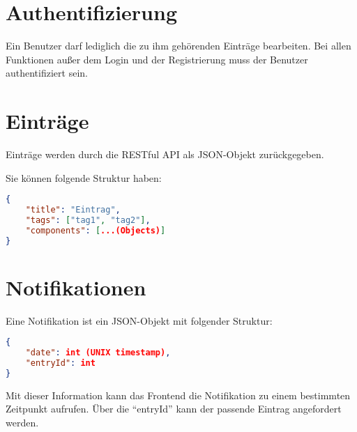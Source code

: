 \section{Authentifizierung}
Ein Benutzer darf lediglich die zu ihm gehörenden Einträge bearbeiten. 
Bei allen Funktionen außer dem Login und der Registrierung muss der Benutzer authentifiziert sein.

\section{Einträge}
Einträge werden durch die RESTful API als JSON-Objekt zurückgegeben.

Sie können folgende Struktur haben:

\begin{lstlisting}[language=JSON]
{
    "title": "Eintrag",
    "tags": ["tag1", "tag2"],
    "components": [...(Objects)]
}
\end{lstlisting}

\section{Notifikationen}
Eine Notifikation ist ein JSON-Objekt mit folgender Struktur:

\begin{lstlisting}[language=JSON]
{
    "date": int (UNIX timestamp),
    "entryId": int
}
\end{lstlisting}

Mit dieser Information kann das Frontend die Notifikation zu einem bestimmten Zeitpunkt aufrufen. Über die \enquote{entryId} kann der passende Eintrag angefordert werden.

